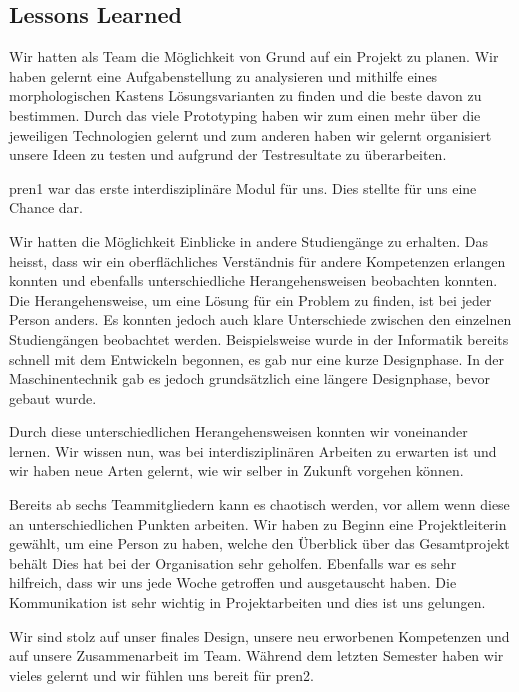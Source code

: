 \subsection{Lessons Learned}

Wir hatten als Team die Möglichkeit von Grund auf ein Projekt zu planen. Wir haben gelernt eine Aufgabenstellung zu analysieren und mithilfe eines morphologischen Kastens Lösungsvarianten zu finden und die beste davon zu bestimmen. Durch das viele Prototyping haben wir zum einen mehr über die jeweiligen Technologien gelernt und zum anderen haben wir gelernt organisiert unsere Ideen zu testen und aufgrund der Testresultate zu überarbeiten.

\acrshort{pren1} war das erste interdisziplinäre Modul für uns. Dies stellte für uns eine Chance dar.

Wir hatten die Möglichkeit Einblicke in andere Studiengänge zu erhalten. Das heisst, dass wir ein oberflächliches Verständnis für andere Kompetenzen erlangen konnten und ebenfalls unterschiedliche Herangehensweisen beobachten konnten.
Die Herangehensweise, um eine Lösung für ein Problem zu finden, ist bei jeder Person anders. Es konnten jedoch auch klare Unterschiede zwischen den einzelnen Studiengängen beobachtet werden.
Beispielsweise wurde in der Informatik bereits schnell mit dem Entwickeln begonnen, es gab nur eine kurze Designphase. In der Maschinentechnik gab es jedoch grundsätzlich eine längere Designphase, bevor gebaut wurde.

Durch diese unterschiedlichen Herangehensweisen konnten wir voneinander lernen.
Wir wissen nun, was bei interdisziplinären Arbeiten zu erwarten ist und wir haben neue Arten gelernt, wie wir selber in Zukunft vorgehen können.

Bereits ab sechs Teammitgliedern kann es chaotisch werden, vor allem wenn diese an unterschiedlichen Punkten arbeiten.
Wir haben zu Beginn eine Projektleiterin gewählt, um eine Person zu haben, welche den Überblick über das Gesamtprojekt behält
Dies hat bei der Organisation sehr geholfen. Ebenfalls war es sehr hilfreich, dass wir uns jede Woche getroffen und ausgetauscht haben. Die Kommunikation ist sehr wichtig in Projektarbeiten und dies ist uns gelungen.

Wir sind stolz auf unser finales Design, unsere neu erworbenen Kompetenzen und auf unsere Zusammenarbeit im Team. Während dem letzten Semester haben wir vieles gelernt und wir fühlen uns bereit für \acrshort{pren2}.



